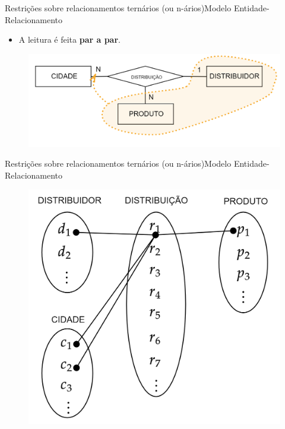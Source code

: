 \documentclass[t]{beamer}
\begin{document}

\begin{ftst}{Restrições sobre relacionamentos ternários
(ou n-ários)}{Modelo Entidade-Relacionamento}
\begin{itemize}
    \item A leitura é feita \textbf{par a par}.
\end{itemize}

\begin{figure}
    \centering
    \includegraphics[scale=0.2]{Figuras/01_26.png}
\end{figure}

\end{ftst}


\begin{ftst}{Restrições sobre relacionamentos ternários
(ou n-ários)}{Modelo Entidade-Relacionamento}

\begin{figure}
    \centering
    \includegraphics[scale=0.16]{Figuras/01_29.png}
\end{figure}

\end{ftst}
\end{document}
